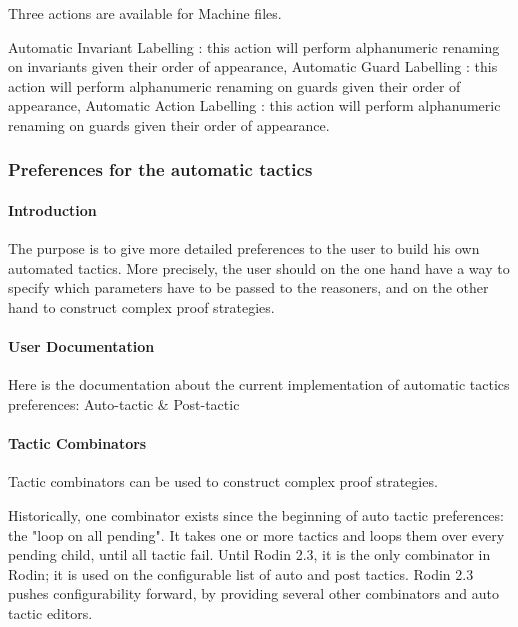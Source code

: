 Three actions are available for Machine files.

    Automatic Invariant Labelling : this action will perform alphanumeric renaming on invariants given their order of appearance,
    Automatic Guard Labelling : this action will perform alphanumeric renaming on guards given their order of appearance,
    Automatic Action Labelling : this action will perform alphanumeric renaming on guards given their order of appearance. 


\subsubsection{Preferences for the automatic tactics}


\paragraph{Introduction}

The purpose is to give more detailed preferences to the user to build his own automated tactics. More precisely, the user should on the one hand have a way to specify which parameters have to be passed to the reasoners, and on the other hand to construct complex proof strategies.

\paragraph{User Documentation}

Here is the documentation about the current implementation of automatic tactics preferences: Auto-tactic \& Post-tactic

\paragraph{Tactic Combinators}

Tactic combinators can be used to construct complex proof strategies.

Historically, one combinator exists since the beginning of auto tactic preferences: the "loop on all pending". It takes one or more tactics and loops them over every pending child, until all tactic fail. Until Rodin 2.3, it is the only combinator in Rodin; it is used on the configurable list of auto and post tactics. Rodin 2.3 pushes configurability forward, by providing several other combinators and auto tactic editors.

